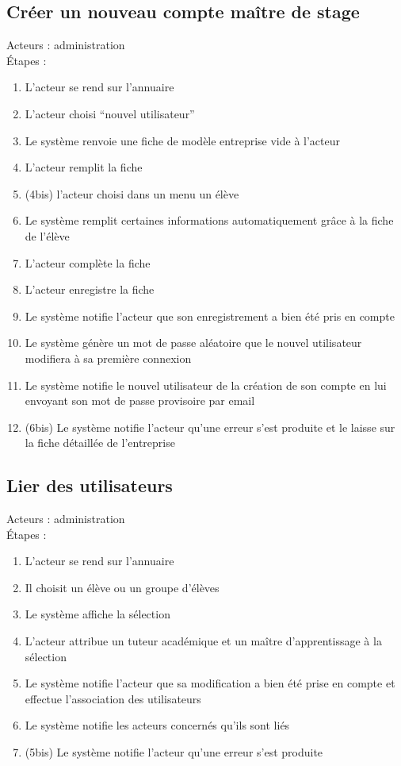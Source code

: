 \documentclass{scrreprt}
\begin{document}
\subsection{Créer un nouveau compte maître de stage}
Acteurs : administration
\\
\'Etapes :
\begin{enumerate}
\item L’acteur se rend sur l’annuaire
\item L’acteur choisi “nouvel utilisateur”
\item Le système renvoie une fiche de modèle entreprise vide à l’acteur 
\item L’acteur remplit la fiche
\item (4bis) l’acteur choisi dans un menu un élève 
\item Le système remplit certaines informations automatiquement grâce à la fiche de l’élève
\item L’acteur complète la fiche
\item L’acteur enregistre la fiche
\item Le système notifie l’acteur que son enregistrement a bien été pris en compte
\item Le système génère un mot de passe aléatoire que le nouvel utilisateur modifiera à sa première connexion
\item Le système notifie le nouvel utilisateur de la création de son compte en lui envoyant son mot de passe provisoire par email
\item (6bis) Le système notifie l’acteur qu’une erreur s’est produite et le laisse sur la fiche détaillée de l’entreprise
\end{enumerate}
\subsection{ Lier des utilisateurs}
Acteurs : administration
\\
\'Etapes :
\begin{enumerate}
\item L’acteur se rend sur l’annuaire
\item Il choisit un élève ou un groupe d’élèves 
\item Le système affiche la sélection
\item L’acteur attribue un tuteur académique et un maître d’apprentissage à la sélection
\item Le système notifie l’acteur que sa modification a bien été prise en compte et effectue l’association des utilisateurs
\item Le système notifie les acteurs concernés qu’ils sont liés
\item (5bis) Le système notifie l’acteur qu’une erreur s’est produite 
\end{enumerate}
\end{document}
